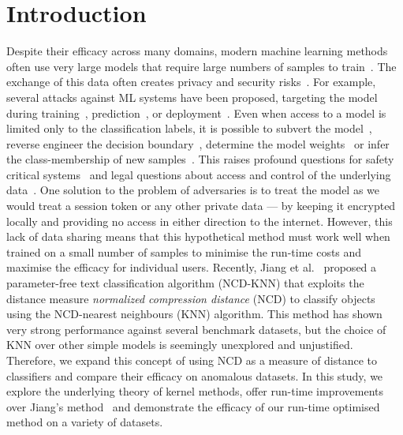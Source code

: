 \documentclass[conference]{IEEEtran}
\begin{document}
\section{Introduction}

Despite their efficacy across many domains, modern machine learning methods often use very large models that require large numbers of samples to train~\cite{desislavov2021compute}. 
The exchange of this data often creates privacy and security risks~\cite{chakraborty_adversarial_2018,meyers}. For example, several attacks against ML systems have been proposed, targeting the model during training~\cite{biggio_poisoning_2013}, prediction~\cite{biggio_evasion_2013,deepfool,carlini_towards_2017}, or deployment~\cite{distributed_attacks,santos2021universal}. 
Even when access to a model is limited only to the classification labels, it is possible to subvert the model~\cite{hopskipjump}, reverse engineer the decision boundary~\cite{deepfool}, determine the model weights~\cite{jagielski2020high} or infer the class-membership of new samples~\cite{bentley2020quantifying}. 
This raises profound questions for safety critical systems~\cite{meyers} and legal questions about access and control of the underlying data~\cite{mitrou2018data,marks2023ai}. 
One solution to the problem of adversaries is to treat the model as we would treat a session token or any other private data --- by keeping it encrypted locally and providing no access in either direction to the internet. 
However, this lack of data sharing means that this hypothetical method must work well when trained on a small number of samples to minimise the run-time costs and maximise the efficacy for individual users. 
Recently, Jiang et al.~\cite{jiang2022less} proposed a parameter-free text classification algorithm (NCD-KNN) that exploits the distance measure \textit{normalized compression distance} (NCD) to classify objects using the NCD-nearest neighbours (KNN) algorithm.
This method has shown very strong performance against several benchmark datasets, but the choice of KNN over other simple models is seemingly unexplored and unjustified.
Therefore, we expand this concept of using NCD as a measure of distance to classifiers and compare their efficacy on anomalous datasets.
In this study, we explore the underlying theory of kernel methods, offer run-time improvements over Jiang's method~\cite{jiang2022less} and demonstrate the efficacy of our run-time optimised method on a variety of datasets.  
\end{document}
